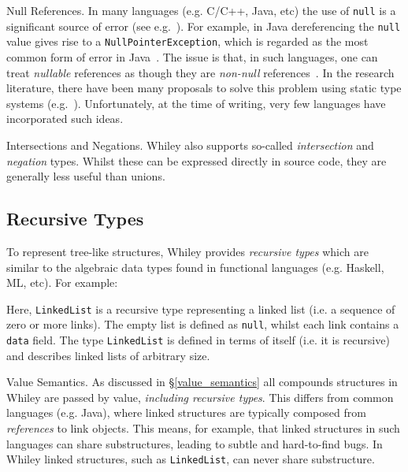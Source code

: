 \begin{insight}{Null References.}  In many languages (e.g. C/C++,
  Java, etc) the use of \lstinline{null} is a significant source of
  error (see e.g.~\cite{Hoa09}).  For example, in Java dereferencing
  the \lstinline{null} value gives rise to a
  \lstinline{NullPointerException}, which is regarded as the most
  common form of error in Java~\cite{XYZ}.  The issue is that, in such
  languages, one can treat {\em nullable} references as though they
  are {\em non-null} references~\cite{Pier02}.  In the research
  literature, there have been many proposals to solve this problem
  using static type systems
  (e.g.~\cite{PQVHV01,FL03,KH07,CFJJ06,CJ07,MPPD08,Hub08,HJP08}).
  Unfortunately, at the time of writing, very few languages have
  incorporated such ideas.
\end{insight}

\begin{insight}{Intersections and Negations.}
  Whiley also supports so-called {\em intersection} and {\em negation}
  types.  Whilst these can be expressed directly in source code, they
  are generally less useful than unions.
\end{insight}


\subsection{Recursive Types}
To represent tree-like structures, Whiley provides {\em recursive
  types} which are similar to the algebraic data types found in
functional languages (e.g. Haskell, ML, etc).  For example:



Here, \lstinline{LinkedList} is a recursive type representing a linked
list (i.e. a sequence of zero or more links).  The empty list is
defined as \lstinline{null}, whilst each link contains a
\lstinline{data} field.  The type \lstinline{LinkedList} is defined in
terms of itself (i.e. it is recursive) and describes linked lists of
arbitrary size.

\begin{insight}{Value Semantics.}
  As discussed in \S\ref{value_semantics} all compounds structures in
  Whiley are passed by value, {\em including recursive types}.  This
  differs from common languages (e.g. Java), where linked structures
  are typically composed from {\em references} to link objects.  This
  means, for example, that linked structures in such languages can
  share substructures, leading to subtle and hard-to-find bugs.  In
  Whiley linked structures, such as \lstinline{LinkedList}, can never
  share substructure.
\end{insight}

